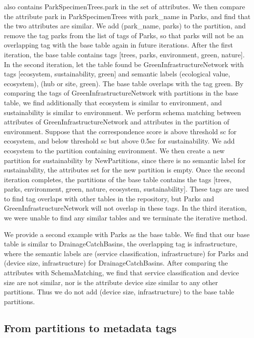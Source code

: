 also contains ParkSpecimenTrees.park in the set of attributes. We then compare the attribute park in ParkSpecimenTrees with park\_name in Parks, and find that the two attributes are similar. We add (park\_name, parks) to the partition, and remove the tag parks from the list of tags of Parks, so that parks will not be an overlapping tag with the base table again in future iterations. After the first iteration, the base table contains tags [trees, parks, environment, green, nature]. In the second iteration, let the table found be GreenInfrastructureNetwork with tags [ecosystem, sustainability, green] and semantic labels {(ecological value, ecosystem), (hub or site, green)}. The base table overlaps with the tag green. By comparing the tags of GreenInfrastructureNetwork with partitions in the base table, we find additionally that ecosystem is similar to environment, and sustainability is similar to environment. We perform schema matching between attributes of GreenInfrastructureNetwork and attributes in the partition of environment. Suppose that the correspondence score is above threshold sc for ecosystem, and below threshold sc but above 0.5sc for sustainability. We add ecosystem to the partition containing environment. We then create a new partition for sustainability by NewPartitions, since there is no semantic label for sustainability, the attributes set for the new partition is empty. Once the second iteration completes, the partitions of the base table contains the tags [trees, parks, environment, green, nature, ecosystem, sustainability]. These tags are used to find tag overlaps with other tables in the repository, but Parks and GreenInfrastructureNetwork will not overlap in these tags. In the third iteration, we were unable to find any similar tables and we terminate the iterative method.

We provide a second example with Parks as the base table. We find that our base table is similar to DrainageCatchBasins, the overlapping tag is infrastructure, where the semantic labels are (service classification, infrastructure) for Parks and (device size, infrastructure) for DrainageCatchBasins. After comparing the attributes with SchemaMatching, we find that
service classification and device size are not similar, nor is the attribute device size similar to any other partitions. Thus we do not add (device size, infrastructure) to the base table partitions.

\subsection{From partitions to metadata tags}
\label{ssec:FromPartitionsToMetadataTags}


